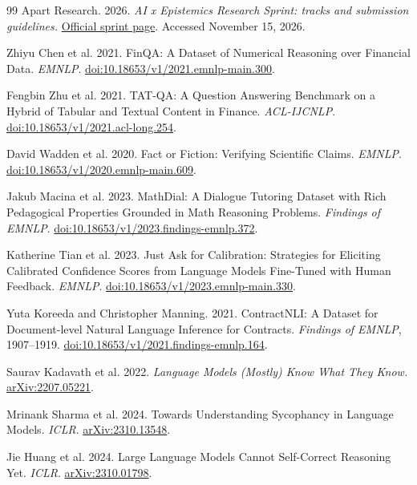 {\raggedright
\begin{thebibliography}{99}
 Apart Research. 2026.
\emph{AI x Epistemics Research Sprint: tracks and submission guidelines.}
\href{https://apartresearch.com/sprints/ai-x-epistemics-research-sprint-2026-11-13-to-2026-11-15}{Official sprint page}.
Accessed November 15, 2026.

 Zhiyu Chen et al. 2021.
FinQA: A Dataset of Numerical Reasoning over Financial Data.
\emph{EMNLP}.
\href{https://aclanthology.org/2021.emnlp-main.300/}{doi:10.18653/v1/2021.emnlp-main.300}.

 Fengbin Zhu et al. 2021.
TAT-QA: A Question Answering Benchmark on a Hybrid of Tabular and Textual Content in Finance.
\emph{ACL-IJCNLP}.
\href{https://aclanthology.org/2021.acl-long.254/}{doi:10.18653/v1/2021.acl-long.254}.

 David Wadden et al. 2020.
Fact or Fiction: Verifying Scientific Claims.
\emph{EMNLP}.
\href{https://aclanthology.org/2020.emnlp-main.609/}{doi:10.18653/v1/2020.emnlp-main.609}.

 Jakub Macina et al. 2023.
MathDial: A Dialogue Tutoring Dataset with Rich Pedagogical Properties Grounded in Math Reasoning Problems.
\emph{Findings of EMNLP}.
\href{https://aclanthology.org/2023.findings-emnlp.372/}{doi:10.18653/v1/2023.findings-emnlp.372}.

 Katherine Tian et al. 2023.
Just Ask for Calibration: Strategies for Eliciting Calibrated Confidence Scores from Language Models Fine-Tuned with Human Feedback.
\emph{EMNLP}.
\href{https://aclanthology.org/2023.emnlp-main.330/}{doi:10.18653/v1/2023.emnlp-main.330}.

 Yuta Koreeda and Christopher Manning. 2021.
ContractNLI: A Dataset for Document-level Natural Language Inference for Contracts.
\emph{Findings of EMNLP}, 1907--1919.
\href{https://aclanthology.org/2021.findings-emnlp.164/}{doi:10.18653/v1/2021.findings-emnlp.164}.

 Saurav Kadavath et al. 2022.
\emph{Language Models (Mostly) Know What They Know.}
\href{https://arxiv.org/abs/2207.05221}{arXiv:2207.05221}.

 Mrinank Sharma et al. 2024.
Towards Understanding Sycophancy in Language Models. \emph{ICLR}.
\href{https://arxiv.org/abs/2310.13548}{arXiv:2310.13548}.

 Jie Huang et al. 2024.
Large Language Models Cannot Self-Correct Reasoning Yet. \emph{ICLR}.
\href{https://arxiv.org/abs/2310.01798}{arXiv:2310.01798}.


\end{thebibliography}}
